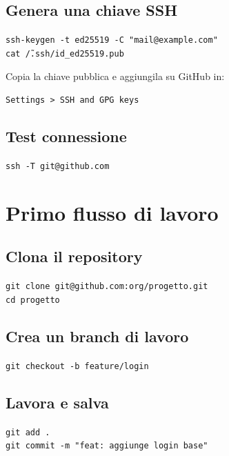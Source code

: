 \documentclass[a4paper,11pt]{article}
\begin{document}
\subsection{Genera una chiave SSH}
\begin{codebox}
\texttt{ssh-keygen -t ed25519 -C "mail@example.com"} \\
\texttt{cat \~/.ssh/id\_ed25519.pub}
\end{codebox}

Copia la chiave pubblica e aggiungila su GitHub in:
\begin{codebox}
\texttt{Settings > SSH and GPG keys}
\end{codebox}

\subsection{Test connessione}
\begin{codebox}
\texttt{ssh -T git@github.com}
\end{codebox}

\section{Primo flusso di lavoro}
\subsection{Clona il repository}
\begin{codebox}
\texttt{git clone git@github.com:org/progetto.git} \\
\texttt{cd progetto}
\end{codebox}

\subsection{Crea un branch di lavoro}
\begin{codebox}
\texttt{git checkout -b feature/login}
\end{codebox}

\subsection{Lavora e salva}
\begin{codebox}
\texttt{git add .} \\
\texttt{git commit -m "feat: aggiunge login base"}
\end{codebox}
\end{document}
